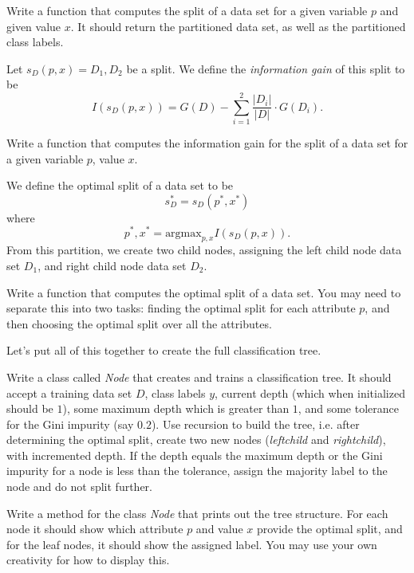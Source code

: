 \begin{problem}
Write a function that computes the split of a data set for a given variable $p$ and given value $x$. It should return the partitioned data set, as well as the partitioned class labels.
\end{problem}

\begin{definition}
Let $s_{D}(p,x) = D_{1},D_{2}$ be a split. We define the \emph{information gain} of this split to be $$I(s_{D}(p,x)) = G(D) - \sum_{i=1}^{2} \frac{\lvert D_{i} \rvert}{\lvert D \rvert} \cdot G(D_{i}).$$
\end{definition}

\begin{problem}
Write a function that computes the information gain for the split of a data set for a given variable $p$, value $x$.
\end{problem}

We define the optimal split of a data set to be $$s_{D}^{*} = s_{D}(p^{*}, x^{*})$$ where $$p^{*}, x^{*} = \text{argmax}_{p,x} I(s_{D}(p,x)).$$ From this partition, we create two child nodes, assigning the left child node data set $D_{1}$, and right child node data set $D_{2}$.

\begin{problem}
Write a function that computes the optimal split of a data set. You may need to separate this into two tasks: finding the optimal split for each attribute $p$, and then choosing the optimal split over all the attributes.
\end{problem}

Let's put all of this together to create the full classification tree.

\begin{problem}
Write a class called \emph{Node} that creates and trains a classification tree. It should accept a training data set $D$, class labels $y$, current depth (which when initialized should be $1$), some maximum depth which is greater than $1$, and some tolerance for the Gini impurity (say $0.2$). Use recursion to build the tree, i.e. after determining the optimal split, create two new nodes (\emph{leftchild} and \emph{rightchild}), with incremented depth. If the depth equals the maximum depth or the Gini impurity for a node is less than the tolerance, assign the majority label to the node and do not split further.
\end{problem}

\begin{problem}
Write a method for the class \emph{Node} that prints out the tree structure. For each node it should show which attribute $p$ and value $x$ provide the optimal split, and for the leaf nodes, it should show the assigned label. You may use your own creativity for how to display this.
\end{problem}

